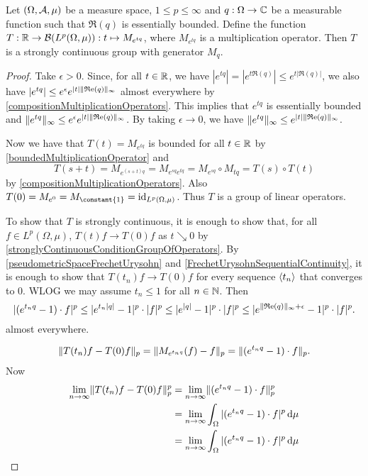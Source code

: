 \begin{proposition}
Let $\sSet{\Omega, \mathcal{A}, \mu}$ be a measure space, $1\leq p \leq \infty$ and $q: \Omega \to \mathbb{C}$ be a measurable function such that $\Re(q)$ is essentially bounded. Define the function $T: \mathbb{R}\to \operatorname{\mathcal{B}}(L^p(\Omega, \mu)): t\mapsto M_{e^{tq}}$, where $M_{e^{tq}}$ is a multiplication operator. Then $T$ is a strongly continuous group with generator $M_q$.
\end{proposition}
\begin{proof}
Take $\epsilon > 0$. Since, for all $t\in\mathbb{R}$, we have $|e^{tq}| = |e^{t\Re(q)}| \leq e^{t|\Re(q)|}$, we also have $|e^{tq}| \leq e^\epsilon e^{|t|\lVert\operatorname{\mathfrak{R}e}(q)\rVert_\infty}$ almost everywhere by \ref{compositionMultiplicationOperators}. This implies that $e^{tq}$ is essentially bounded and $\lVert e^{tq}\rVert_\infty \leq e^\epsilon e^{|t|\lVert\operatorname{\mathfrak{R}e}(q)\rVert_\infty}$. By taking $\epsilon \to 0$, we have $\lVert e^{tq}\rVert_\infty \leq e^{|t|\lVert\operatorname{\mathfrak{R}e}(q)\rVert_\infty}$.

Now we have that $T(t) = M_{e^{tq}}$ is bounded for all $t\in \mathbb{R}$ by \ref{boundedMultiplicationOperator} and
\[ T(s+t) = M_{e^{(s+t)q}} = M_{e^{sq}e^{tq}} = M_{e^{sq}}\circ M_{tq} = T(s)\circ T(t) \]
by \ref{compositionMultiplicationOperators}. Also $T(0) = M_{e^{0}} = M_{\constant{1}} = \id_{L^p(\Omega, \mu)}$. Thus $T$ is a group of linear operators.

To show that $T$ is strongly continuous, it is enough to show that, for all $f\in L^p(\Omega, \mu)$, $T(t)f \to T(0)f$ as $t\searrow 0$ by \ref{stronglyContinuousConditionGroupOfOperators}. By \ref{pseudometricSpaceFrechetUrysohn} and \ref{FrechetUrysohnSequentialContinuity}, it is enough to show that $T(t_n)f \to T(0)f$ for every sequence $\left\langle t_n \right\rangle$ that converges to $0$. WLOG we may assume $t_n \leq 1$ for all $n\in \mathbb{N}$. Then
\[ |(e^{t_nq} - 1)\cdot f|^p \leq |e^{t_n|q|} - 1|^p\cdot |f|^p \leq |e^{|q|} - 1|^p\cdot |f|^p \leq |e^{\lVert\operatorname{\mathfrak{R}e}(q)\rVert_\infty+ \epsilon} - 1|^p\cdot |f|^p. \]
almost everywhere.


\begin{align*}
\lVert T(t_n)f - T(0)f\rVert_p = \lVert M_{e^{t_nq}}(f) - f\rVert_p = \lVert(e^{t_nq} - 1)\cdot f\rVert_p.
\end{align*}
Now
\begin{align*}
\lim_{n\to \infty} \lVert T(t_n)f - T(0)f\rVert_p^p &= \lim_{n\to \infty} \lVert(e^{t_nq} - 1)\cdot f\rVert_p^p \\
&= \lim_{n\to \infty} \int_\Omega |(e^{t_nq} - 1)\cdot f|^p \operatorname{d \!}{\mu} \\
&= \lim_{n\to \infty} \int_\Omega |(e^{t_nq} - 1)\cdot f|^p \operatorname{d \!}{\mu} \\
\end{align*}
\end{proof}




